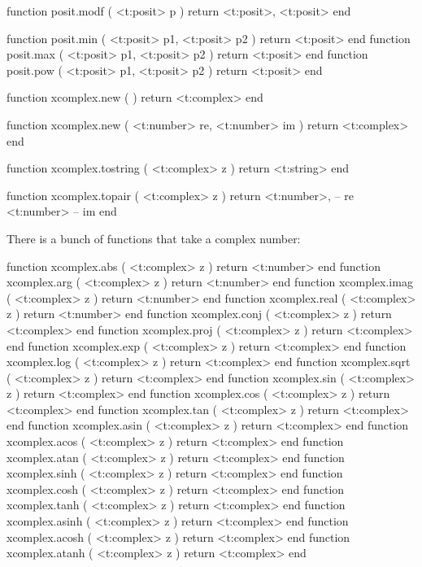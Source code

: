 function posit.modf ( <t:posit> p )
    return
        <t:posit>,
        <t:posit>
end

function posit.min ( <t:posit> p1, <t:posit> p2 ) return <t:posit> end
function posit.max ( <t:posit> p1, <t:posit> p2 ) return <t:posit> end
function posit.pow ( <t:posit> p1, <t:posit> p2 ) return <t:posit> end
\stoptyping


\stopsubsection

\startsubsection[title=Complex numbers]

\starttyping[option=LUA]
function xcomplex.new ( )
    return <t:complex>
end

function xcomplex.new (
    <t:number> re,
    <t:number> im
)
    return <t:complex>
end
\stoptyping

\starttyping[option=LUA]
function xcomplex.tostring ( <t:complex> z )
    return <t:string>
end
\stoptyping

\starttyping[option=LUA]
function xcomplex.topair ( <t:complex> z )
    return
        <t:number>, -- re
        <t:number>  -- im
end
\stoptyping

There is a bunch of functions that take a complex number:

\starttyping[option=LUA]
function xcomplex.abs   ( <t:complex> z ) return <t:number>  end
function xcomplex.arg   ( <t:complex> z ) return <t:number>  end
function xcomplex.imag  ( <t:complex> z ) return <t:number>  end
function xcomplex.real  ( <t:complex> z ) return <t:number>  end
function xcomplex.conj  ( <t:complex> z ) return <t:complex> end
function xcomplex.proj  ( <t:complex> z ) return <t:complex> end
function xcomplex.exp   ( <t:complex> z ) return <t:complex> end
function xcomplex.log   ( <t:complex> z ) return <t:complex> end
function xcomplex.sqrt  ( <t:complex> z ) return <t:complex> end
function xcomplex.sin   ( <t:complex> z ) return <t:complex> end
function xcomplex.cos   ( <t:complex> z ) return <t:complex> end
function xcomplex.tan   ( <t:complex> z ) return <t:complex> end
function xcomplex.asin  ( <t:complex> z ) return <t:complex> end
function xcomplex.acos  ( <t:complex> z ) return <t:complex> end
function xcomplex.atan  ( <t:complex> z ) return <t:complex> end
function xcomplex.sinh  ( <t:complex> z ) return <t:complex> end
function xcomplex.cosh  ( <t:complex> z ) return <t:complex> end
function xcomplex.tanh  ( <t:complex> z ) return <t:complex> end
function xcomplex.asinh ( <t:complex> z ) return <t:complex> end
function xcomplex.acosh ( <t:complex> z ) return <t:complex> end
function xcomplex.atanh ( <t:complex> z ) return <t:complex> end

